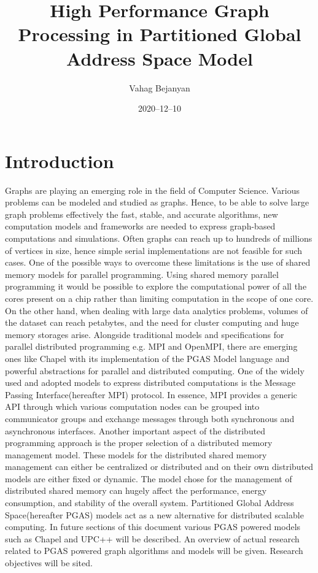 \documentclass[14pt]{extreport}
\title{High Performance Graph Processing in Partitioned Global Address Space Model}
\date{2020--12--10}
\author{Vahag Bejanyan}
\newcommand\blankpage{
    \null
    \thispagestyle{empty}
    \newpage
    }
\begin{document}
\maketitle
{}
\newpage
{}

\tableofcontents
\blankpage

\chapter{Introduction}
Graphs are playing an emerging role in the field of Computer Science. Various problems can be modeled and studied as graphs\cite{fouss_saerens_shimbo_2016}. Hence, to be able to solve large graph problems effectively the fast, stable, and accurate algorithms, new computation models and frameworks are needed to express graph-based computations and simulations. Often graphs can reach up to hundreds of millions of vertices in size, hence simple serial implementations are not feasible for such cases. One of the possible ways to overcome these limitations is the use of shared memory models for parallel programming\cite{patterson_hennessy}. Using shared memory parallel programming it would be possible to explore the computational power of all the cores present on a chip rather than limiting computation in the scope of one core. On the other hand, when dealing with large data analytics problems\cite{hadoop}\cite{mapreduce}, volumes of the dataset can reach petabytes, and the need for cluster computing and huge memory storages arise. Alongside traditional models and specifications for parallel distributed programming e.g. MPI and OpenMPI, there are emerging ones like Chapel with its implementation of the PGAS Model language and powerful abstractions for parallel and distributed computing. One of the widely used and adopted models to express distributed computations is the Message Passing Interface(hereafter MPI) protocol. In essence, MPI provides a generic API through which various computation nodes can be grouped into communicator groups and exchange messages through both synchronous and asynchronous interfaces. Another important aspect of the distributed programming approach is the proper selection of a distributed memory management model\cite{dsmmng}. These models for the distributed shared memory management can either be centralized or distributed and on their own distributed models are either fixed or dynamic. The model chose for the management of distributed shared memory can hugely affect the performance, energy consumption, and stability of the overall system. Partitioned Global Address Space(hereafter PGAS) models act as a new alternative for distributed scalable computing. In future sections of this document various PGAS powered models such as Chapel and UPC++ will be described. An overview of actual research related to PGAS powered graph algorithms and models will be given. Research objectives will be sited.
\end{document}
